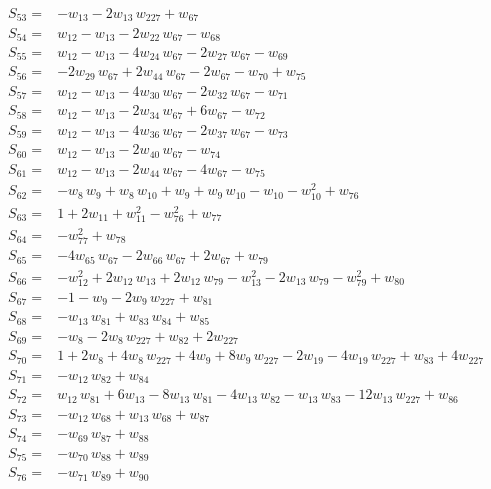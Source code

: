 \begin{align*}
S_{53}={}& -w_{13} - 2w_{13}\,w_{227} + w_{67} \\[2pt]
S_{54}={}& w_{12} - w_{13} - 2w_{22}\,w_{67} - w_{68} \\[2pt]
S_{55}={}& w_{12} - w_{13} - 4w_{24}\,w_{67} - 2w_{27}\,w_{67} - w_{69} \\[2pt]
S_{56}={}& -2w_{29}\,w_{67} + 2w_{44}\,w_{67} - 2w_{67} - w_{70} + w_{75} \\[2pt]
S_{57}={}& w_{12} - w_{13} - 4w_{30}\,w_{67} - 2w_{32}\,w_{67} - w_{71} \\[2pt]
S_{58}={}& w_{12} - w_{13} - 2w_{34}\,w_{67} + 6w_{67} - w_{72} \\[2pt]
S_{59}={}& w_{12} - w_{13} - 4w_{36}\,w_{67} - 2w_{37}\,w_{67} - w_{73} \\[2pt]
S_{60}={}& w_{12} - w_{13} - 2w_{40}\,w_{67} - w_{74} \\[2pt]
S_{61}={}& w_{12} - w_{13} - 2w_{44}\,w_{67} - 4w_{67} - w_{75} \\[2pt]
S_{62}={}& -w_{8}\,w_{9} + w_{8}\,w_{10} + w_{9} + w_{9}\,w_{10} - w_{10} - w_{10}^{2} + w_{76} \\[2pt]
S_{63}={}& 1 + 2w_{11} + w_{11}^{2} - w_{76}^{2} + w_{77} \\[2pt]
S_{64}={}& -w_{77}^{2} + w_{78} \\[2pt]
S_{65}={}& -4w_{65}\,w_{67} - 2w_{66}\,w_{67} + 2w_{67} + w_{79} \\[2pt]
S_{66}={}& -w_{12}^{2} + 2w_{12}\,w_{13} + 2w_{12}\,w_{79} - w_{13}^{2} - 2w_{13}\,w_{79} - w_{79}^{2} + w_{80} \\[2pt]
S_{67}={}& -1 - w_{9} - 2w_{9}\,w_{227} + w_{81} \\[2pt]
S_{68}={}& -w_{13}\,w_{81} + w_{83}\,w_{84} + w_{85} \\[2pt]
S_{69}={}& -w_{8} - 2w_{8}\,w_{227} + w_{82} + 2w_{227} \\[2pt]
S_{70}={}& 1 + 2w_{8} + 4w_{8}\,w_{227} + 4w_{9} + 8w_{9}\,w_{227} - 2w_{19} - 4w_{19}\,w_{227} + w_{83} + 4w_{227} \\[2pt]
S_{71}={}& -w_{12}\,w_{82} + w_{84} \\[2pt]
S_{72}={}& w_{12}\,w_{81} + 6w_{13} - 8w_{13}\,w_{81} - 4w_{13}\,w_{82} - w_{13}\,w_{83} - 12w_{13}\,w_{227} + w_{86} \\[2pt]
S_{73}={}& -w_{12}\,w_{68} + w_{13}\,w_{68} + w_{87} \\[2pt]
S_{74}={}& -w_{69}\,w_{87} + w_{88} \\[2pt]
S_{75}={}& -w_{70}\,w_{88} + w_{89} \\[2pt]
S_{76}={}& -w_{71}\,w_{89} + w_{90} \\[2pt]

\end{align*}
